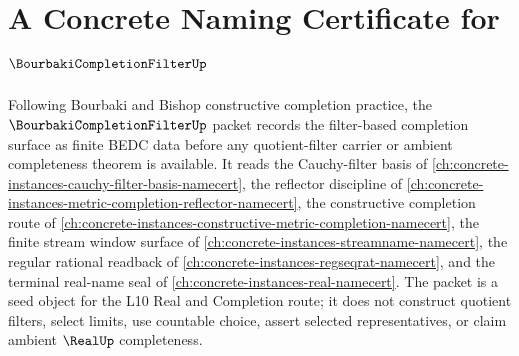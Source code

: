 \chapter{A Concrete Naming Certificate for $\BourbakiCompletionFilterUp$}
\label{ch:concrete-instances-bourbaki-completion-filter-namecert}

Following Bourbaki and Bishop constructive completion practice, the $\BourbakiCompletionFilterUp$ packet records the filter-based completion surface as finite BEDC data before any quotient-filter carrier or ambient completeness theorem is available. It reads the Cauchy-filter basis of \autoref{ch:concrete-instances-cauchy-filter-basis-namecert}, the reflector discipline of \autoref{ch:concrete-instances-metric-completion-reflector-namecert}, the constructive completion route of \autoref{ch:concrete-instances-constructive-metric-completion-namecert}, the finite stream window surface of \autoref{ch:concrete-instances-streamname-namecert}, the regular rational readback of \autoref{ch:concrete-instances-regseqrat-namecert}, and the terminal real-name seal of \autoref{ch:concrete-instances-real-namecert}. The packet is a seed object for the L10 Real and Completion route; it does not construct quotient filters, select limits, use countable choice, assert selected representatives, or claim ambient $\RealUp$ completeness.

